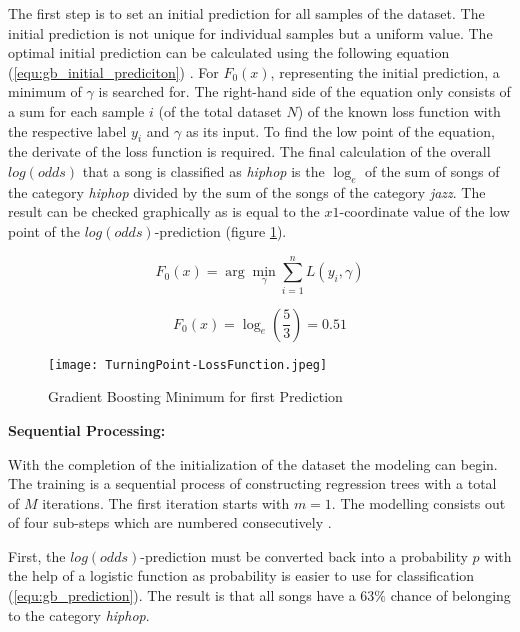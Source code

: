 The first step is to set an initial prediction for all samples of the dataset. The initial 
prediction is not unique for individual samples but a uniform value. The optimal initial 
prediction can be calculated using the following equation (\ref{equ:gb_initial_prediciton}) \cite[p. 361]{Hastie_2009}. For \(F_{0}(x)\), representing the 
initial prediction, a minimum of \(\gamma \) is searched for. The right-hand side of the equation 
only consists of a sum for each sample \(i\) (of the total dataset \(N\)) of the known loss function 
with the respective label \(y_{i}\) and \(\gamma \) as its input. To find the low point of the equation, 
the derivate of the loss function is required. The final calculation of the overall \(log (odds)\) 
that a song is classified as \emph{hiphop} is the \(\log_{e}\) of the sum of songs of the category \emph{hiphop}
divided by the sum of the songs of the category \emph{jazz}. The result can be checked graphically 
as is equal to the \(x1\)-coordinate value of the low point of the \(log(odds)\)-prediction (figure \ref{fig:gb_turning_point-loss_function}). 

\begin{equation}
    F_{0}(x) = \arg \min_{\gamma } \sum_{i= 1}^{n} L(y_{i}, \gamma)
    \label{equ:gb_initial_prediciton}
\end{equation}

\begin{equation*}
    F_{0}(x) = \log_{e}(\frac{5}{3}) = 0.51
\end{equation*}

\begin{figure}[H]
    \centering
    \caption[]{Gradient Boosting Minimum for first Prediction}
	\label{fig:gb_turning_point-loss_function}
    \texttt{[image: TurningPoint-LossFunction.jpeg]}
\end{figure}

\textbf{Sequential Processing:}

With the completion of the initialization of the dataset the modeling can begin. The training is a sequential 
process of constructing regression trees with a total of \(M\) iterations. The first iteration 
starts with \(m = 1\). The modelling consists out of four sub-steps which are numbered consecutively \cite[p. 1198]{Friedman_2001}.

First, the \(log(odds)\)-prediction must be converted back into a probability \(p\) with the help of a 
logistic function as probability is easier to use for classification (\ref{equ:gb_prediction}). The result is 
that all songs have a \(63\%\) chance of belonging to the category \emph{hiphop}.

